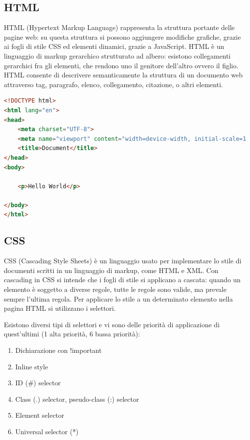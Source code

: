 \subsection{HTML}
HTML (Hypertext Markup Language) rappresenta la struttura portante delle pagine web: su questa struttura si possono aggiungere modifiche grafiche, grazie ai fogli di stile CSS ed elementi dinamici, grazie a JavaScript.
HTML è un linguaggio di markup gerarchico strutturato ad albero: esistono collegamenti gerarchici fra gli elementi, che rendono uno il genitore dell'altro ovvero il figlio.
HTML consente di descrivere semanticamente la struttura di un documento web attraverso tag, paragrafo, elenco, collegamento, citazione, o altri elementi.\cite{html}
\\
\begin{lstlisting}[language=html, basicstyle=\small, caption={Esempio di una pagina html}, captionpos=b]
<!DOCTYPE html>
<html lang="en">
<head>
    <meta charset="UTF-8">
    <meta name="viewport" content="width=device-width, initial-scale=1.0">
    <title>Document</title>
</head>
<body>

    <p>Hello World</p>
    
</body>
</html>
\end{lstlisting}
\newpage
\subsection{CSS}
CSS (Cascading Style Sheets) è un linguaggio usato per implementare lo stile di documenti scritti in un linguaggio di markup, come HTML e XML.
Con cascading in CSS si intende che i fogli di stile si applicano a cascata: quando un elemento è soggetto a diverse regole, tutte le regole sono valide, ma prevale sempre l'ultima regola. \cite{css}
Per applicare lo stile a un determinato elemento nella pagina HTML si utilizzano i selettori.

Esistono diversi tipi di selettori e vi sono delle priorità di applicazione di quest'ultimi (1 alta priorità, 6 bassa priorità):
\begin{enumerate}
    \item Dichiarazione con !important
    \item Inline style
    \item ID (\#) selector
    \item Class (.) selector, pseudo-class (:) selector
    \item Element selector
    \item Universal selector (*)
\end{enumerate}

